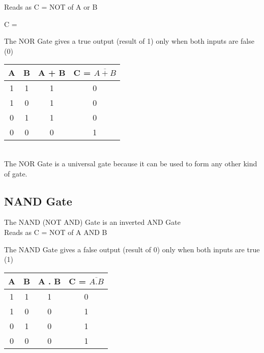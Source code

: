 \documentclass{article}
\begin{document}
\color{red}Reads as C = NOT of A or B \\ \color{black}

C = \begin{center}
\end{center}

The NOR Gate gives a true output (result of 1) only when both inputs are false (0) \\
\begin{table}[h!]
	\begin{center}
		\begin{tabular}{c|c|c|c}
			\textbf{A} & \textbf{B} &
			\textbf{A + B} & \textbf{C = $\overline{A + B}$}\\
			\hline
			1 & 1 & 1 & 0 \\
			\hline
			1 & 0 & 1 & 0 \\
			\hline
			0 & 1 & 1 & 0\\
			\hline
			0 & 0 & 0 & 1\\
			\hline
		\end{tabular}
	\end{center}
\end{table} \\


\color{red}The NOR Gate is a universal gate because it can be used to form any other kind of gate. \\ \color{black}

\subsection{NAND Gate}
The NAND (NOT AND) Gate is an inverted AND Gate \\
\color{red}Reads as C = NOT of A AND B \\ \color{black}

The NAND Gate gives a false output (result of 0) only when both inputs are true (1) \\

\begin{table}[h!]
	\begin{center}
		\begin{tabular}{c|c|c|c}
			\textbf{A} & \textbf{B} &
			\textbf{A . B} & \textbf{C = $\overline{A . B}$}\\
			\hline
			1 & 1 & 1 & 0\\
			\hline
			1 & 0 & 0 & 1\\
			\hline
			0 & 1 & 0 & 1\\
			\hline
			0 & 0 & 0 & 1\\
			\hline
		\end{tabular}
	\end{center}
\end{table} 
\end{document}
